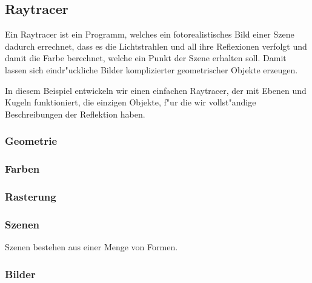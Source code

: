%
%
\subsection{Raytracer}
Ein Raytracer ist ein Programm, welches ein fotorealistisches Bild
einer Szene dadurch errechnet, dass es die Lichtstrahlen und all ihre
Reflexionen verfolgt und damit die Farbe berechnet, welche ein Punkt
der Szene erhalten soll.
Damit lassen sich eindr"uckliche Bilder komplizierter
geometrischer Objekte erzeugen.

In diesem Beispiel entwickeln wir einen einfachen Raytracer, der mit
Ebenen und Kugeln funktioniert, die einzigen Objekte, f"ur die wir
vollst"andige Beschreibungen der Reflektion haben.

\subsubsection{Geometrie}


\subsubsection{Farben}

\subsubsection{Rasterung}

\subsubsection{Szenen}
Szenen bestehen aus einer Menge von Formen.

\subsubsection{Bilder}
